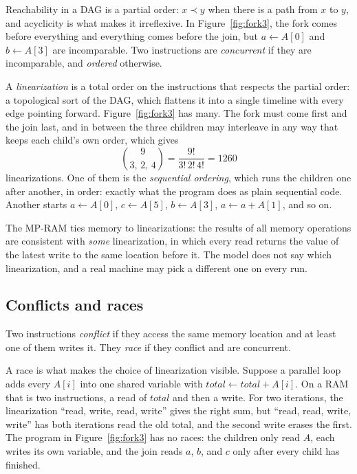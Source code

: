 Reachability in a DAG is a partial order: $x \prec y$ when there is a path from $x$ to $y$, and acyclicity is what makes it irreflexive. In Figure~\ref{fig:fork3}, the fork comes before everything and everything comes before the join, but $a \gets A[0]$ and $b \gets A[3]$ are incomparable. Two instructions are \emph{concurrent} if they are incomparable, and \emph{ordered} otherwise.

A \emph{linearization} is a total order on the instructions that respects the partial order: a topological sort of the DAG, which flattens it into a single timeline with every edge pointing forward. Figure~\ref{fig:fork3} has many. The fork must come first and the join last, and in between the three children may interleave in any way that keeps each child's own order, which gives
\[
  \binom{9}{3,\,2,\,4} = \frac{9!}{3!\,2!\,4!} = 1260
\]
linearizations. One of them is the \emph{sequential ordering}, which runs the children one after another, in order: exactly what the program does as plain sequential code. Another starts $a \gets A[0]$, $c \gets A[5]$, $b \gets A[3]$, $a \gets a + A[1]$, and so on.

The MP-RAM ties memory to linearizations: the results of all memory operations are consistent with \emph{some} linearization, in which every read returns the value of the latest write to the same location before it. The model does not say which linearization, and a real machine may pick a different one on every run.

\subsection{Conflicts and races}

\begin{definition}
Two instructions \emph{conflict} if they access the same memory location and at least one of them writes it. They \emph{race} if they conflict and are concurrent.
\end{definition}

A race is what makes the choice of linearization visible. Suppose a parallel loop adds every $A[i]$ into one shared variable with $\mathit{total} \gets \mathit{total} + A[i]$. On a RAM that is two instructions, a read of $\mathit{total}$ and then a write. For two iterations, the linearization ``read, write, read, write'' gives the right sum, but ``read, read, write, write'' has both iterations read the old total, and the second write erases the first. The program in Figure~\ref{fig:fork3} has no races: the children only read $A$, each writes its own variable, and the join reads $a$, $b$, and $c$ only after every child has finished.

